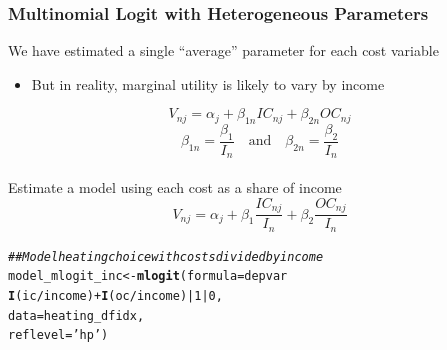 \documentclass{beamer}\usepackage[]{graphicx}\usepackage[]{color}
\makeatletter
\newcommand{\hlnum}[1]{\textcolor[rgb]{0.686,0.059,0.569}{#1}}%
\newcommand{\hlstr}[1]{\textcolor[rgb]{0.192,0.494,0.8}{#1}}%
\newcommand{\hlcom}[1]{\textcolor[rgb]{0.678,0.584,0.686}{\textit{#1}}}%
\newcommand{\hlopt}[1]{\textcolor[rgb]{0,0,0}{#1}}%
\newcommand{\hlstd}[1]{\textcolor[rgb]{0.345,0.345,0.345}{#1}}%
\newcommand{\hlkwb}[1]{\textcolor[rgb]{0.69,0.353,0.396}{#1}}%
\newcommand{\hlkwc}[1]{\textcolor[rgb]{0.333,0.667,0.333}{#1}}%
\newcommand{\hlkwd}[1]{\textcolor[rgb]{0.737,0.353,0.396}{\textbf{#1}}}%
\newenvironment{kframe}{%
 \def\at@end@of@kframe{}%
 \ifinner\ifhmode%
  \def\at@end@of@kframe{\end{minipage}}%
  \begin{minipage}{\columnwidth}%
 \fi\fi%
 \def\FrameCommand##1{\hskip\@totalleftmargin \hskip-\fboxsep
 \colorbox{shadecolor}{##1}\hskip-\fboxsep
     \hskip-\linewidth \hskip-\@totalleftmargin \hskip\columnwidth}%
 \MakeFramed {\advance\hsize-\width
   \@totalleftmargin\z@ \linewidth\hsize
   \@setminipage}}%
 {\par\unskip\endMakeFramed%
 \at@end@of@kframe}
\newenvironment{knitrout}{}{} %
\makeatother
\begin{document}
\begin{frame}[fragile]\frametitle{Multinomial Logit with Heterogeneous Parameters}
    We have estimated a single ``average'' parameter for each cost variable
    \begin{itemize}
        \item But in reality, marginal utility is likely to vary by income
    \end{itemize}
    $$V_{nj} = \alpha_j + \beta_{1n} IC_{nj} + \beta_{2n} OC_{nj}$$
    $$\beta_{1n} = \frac{\beta_1}{I_n} \quad \text{and} \quad \beta_{2n} = \frac{\beta_2}{I_n}$$ \\
    \vspace{2ex}
    Estimate a model using each cost as a share of income
    $$V_{nj} = \alpha_j + \beta_1 \frac{IC_{nj}}{I_n} + \beta_2 \frac{OC_{nj}}{I_n}$$
\begin{knitrout}\footnotesize
{}\color{fgcolor}\begin{kframe}
\begin{alltt}
\hlcom{## Model heating choice with costs divided by income}
\hlstd{model_mlogit_inc} \hlkwb{<-} \hlkwd{mlogit}\hlstd{(}\hlkwc{formula} \hlstd{= depvar} \hlopt{~}
                             \hlkwd{I}\hlstd{(ic} \hlopt{/} \hlstd{income)} \hlopt{+} \hlkwd{I}\hlstd{(oc} \hlopt{/} \hlstd{income)} \hlopt{|} \hlnum{1} \hlopt{|} \hlnum{0}\hlstd{,}
                           \hlkwc{data} \hlstd{= heating_dfidx,}
                           \hlkwc{reflevel} \hlstd{=} \hlstr{'hp'}\hlstd{)}
\end{alltt}
\end{kframe}
\end{knitrout}
\end{frame}
\end{document}
